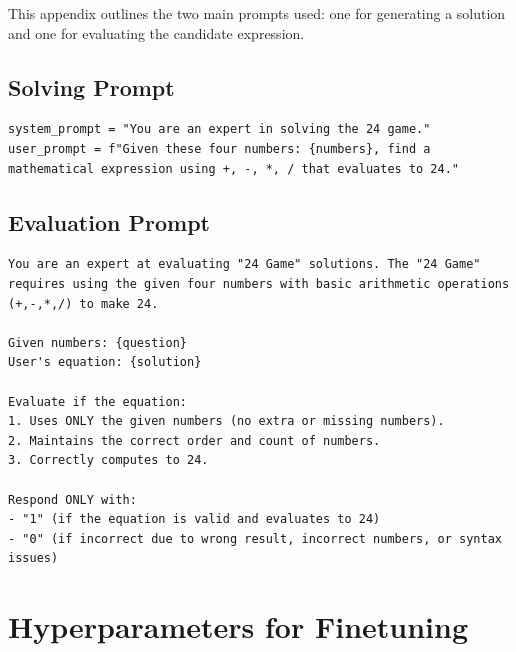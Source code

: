 \documentclass{article}
\begin{document}
This appendix outlines the two main prompts used: one for generating a solution and one for evaluating the candidate expression.

\subsection{Solving Prompt}
\begin{lstlisting}[basicstyle=\footnotesize\ttfamily, breaklines=true]
system_prompt = "You are an expert in solving the 24 game."
user_prompt = f"Given these four numbers: {numbers}, find a mathematical expression using +, -, *, / that evaluates to 24."
\end{lstlisting}

\subsection{Evaluation Prompt}
\begin{lstlisting}[basicstyle=\footnotesize\ttfamily, breaklines=true]
You are an expert at evaluating "24 Game" solutions. The "24 Game" 
requires using the given four numbers with basic arithmetic operations 
(+,-,*,/) to make 24.

Given numbers: {question}
User's equation: {solution}

Evaluate if the equation:
1. Uses ONLY the given numbers (no extra or missing numbers).
2. Maintains the correct order and count of numbers.
3. Correctly computes to 24.

Respond ONLY with:
- "1" (if the equation is valid and evaluates to 24)
- "0" (if incorrect due to wrong result, incorrect numbers, or syntax issues)
\end{lstlisting}

\newpage

\section{Hyperparameters for Finetuning}
\end{document}
